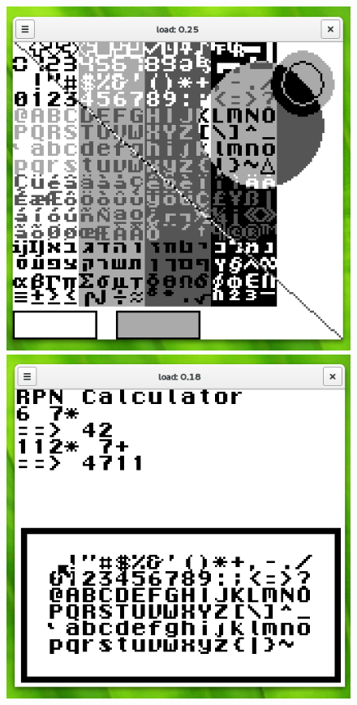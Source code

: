 \documentclass[a4paper]{scrartcl}
\begin{document}
\begin{figure}[H]
\centering
{}
  \includegraphics[width=\linewidth]{img/filltest}\vspace{0.7cm}
  \includegraphics[width=\linewidth]{img/rpn}

\end{figure}
\end{document}
